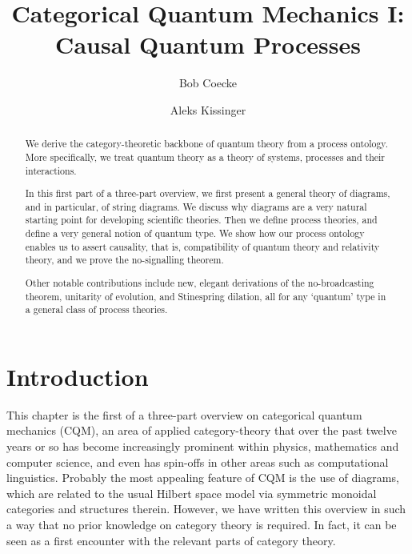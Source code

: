 \documentclass[12pt]{article}
\title{Categorical Quantum Mechanics I:\\  Causal Quantum Processes}
\author[1]{Bob Coecke}
\author[2]{Aleks Kissinger}
\date{}
\affil[1]{Department of Computer Science, Oxford. {\tt coecke@cs.ox.ac.uk}}
\affil[2]{iCIS, Radboud University, Nijmegen. {\tt aleks@cs.ru.nl}}
\begin{document}
     

\maketitle

\begin{abstract}
We derive the category-theoretic backbone of quantum theory  from a process  ontology. More specifically, we treat quantum theory as a theory of systems, processes and their interactions. %

In this first part of a three-part overview, we first present a general theory of diagrams, and in particular, of string diagrams.  We discuss why diagrams are a very natural starting point for developing scientific theories.  Then we define process theories, and define a very general notion of quantum type. We show how our process  ontology  enables us to assert causality, that is, compatibility of quantum theory and relativity theory, and we prove the no-signalling theorem.   

Other notable contributions include new, elegant derivations of the no-broadcasting theorem, unitarity of evolution, and Stinespring dilation, all for any `quantum' type in a general class of process theories.        
\end{abstract}    

\section{Introduction}    

This chapter is the first  of a three-part  overview  on categorical quantum mechanics (CQM), an area of applied category-theory that over the past twelve years or so has become increasingly prominent within physics, mathematics and computer science, and even has spin-offs in other areas such as computational linguistics. Probably the most appealing feature of CQM is the use of diagrams, which are related to the usual Hilbert space model via symmetric monoidal categories and structures therein.  However, we have written this overview in such a way that no prior knowledge on category theory is required. In fact,  it can be seen as a first encounter with the relevant parts of category theory.      
\end{document}
